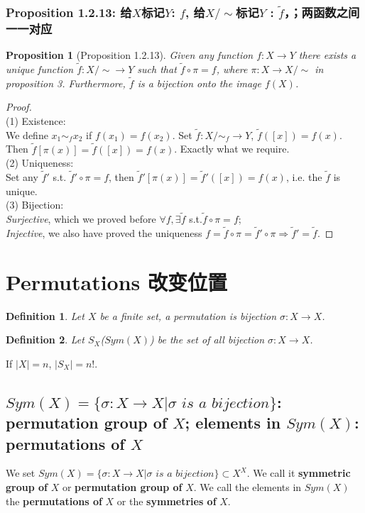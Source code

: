 \documentclass[11pt,a4paper]{article}
\newtheorem{proposition}{Proposition}
\newtheorem{definition}{Definition}
\begin{document}
\subsubsection{Proposition 1.2.13: 给$X$标记$Y$: $f$, 给$X/\sim$标记$Y$ : $\tilde{f}$，；两函数之间一一对应}
\begin{proposition}[Proposition 1.2.13]
    Given any function $f:X \rightarrow Y$ there exists a unique function $\tilde{f}:X/\sim \rightarrow Y$ such that $\tilde{f}\circ \pi=f$, where $\pi: X \rightarrow X/\sim$ in proposition 3. Furthermore, $\tilde{f}$ is a bijection onto the image $f(X)$.
\end{proposition}
\begin{proof}
\quad\\
(1) Existence:\\
We define $x_1\sim_f x_2$ if $f(x_1)=f(x_2)$. Set $\tilde{f}:X/\sim_f \rightarrow Y$, $\tilde{f}([x])=f(x)$. Then $\tilde{f}[\pi(x)]=\tilde{f}([x])=f(x)$. Exactly what we require.\\
(2) Uniqueness:\\
Set any $\tilde{f}'$ s.t. $\tilde{f}'\circ\pi=f$, then $\tilde{f}'[\pi(x)]=\tilde{f}'([x])=f(x)$, i.e. the $\tilde{f}$ is unique.\\
(3) Bijection:\\
\textit{Surjective}, which we proved before $\forall f, \exists \tilde{f}$ s.t.$\tilde{f}\circ\pi=f$;\\
\textit{Injective}, we also have proved the uniqueness $f=\tilde{f}\circ\pi=\tilde{f}'\circ\pi\Rightarrow\tilde{f}'=\tilde{f}$.
\end{proof}





\section{Permutations 改变位置}
\begin{definition}
    Let $X$ be a finite set, a permutation is bijection $\sigma:X \rightarrow X$.
\end{definition}
\begin{definition}
    Let $S_X$($Sym(X)$) be the set of all bijection $\sigma:X \rightarrow X$.
\end{definition}
If $|X|=n$, $|S_X|=n!$.

\subsection{$Sym(X)=\{\sigma: X\rightarrow X| \sigma \textit{ is a bijection} \}$: \textbf{permutation group of} $X$; elements in $Sym(X)$: \textbf{permutations of} $X$}
We set $Sym(X)=\{\sigma: X\rightarrow X| \sigma \textit{ is a bijection} \}\subset X^X$. We call it \textbf{symmetric group of} $X$ or \textbf{permutation group of} $X$. We call the elements in $Sym(X)$ the \textbf{permutations of} $X$ or the \textbf{symmetries of} $X$.
\end{document}
